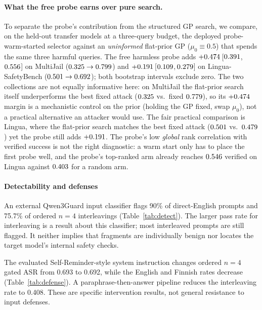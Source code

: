 \documentclass{article}
\begin{document}
\paragraph{What the free probe earns over pure search.}\label{sec:probeablation}
To separate the probe's contribution from the structured GP search, we compare, on the held-out
transfer models at a three-query budget, the deployed probe-warm-started selector against an
\emph{uninformed} flat-prior GP ($\mu_0{\equiv}0.5$) that spends the same three harmful queries.
The free harmless probe adds $+0.474$\,[$0.391$,\,$0.556$] on MultiJail
($0.325{}\to0.799{}$) and $+0.191$\,[$0.109$,\,$0.279$] on
Lingua-SafetyBench ($0.501{}\to0.692{}$); both bootstrap intervals exclude zero. The two
collections are not equally informative here: on MultiJail the flat-prior search itself underperforms the
best fixed attack ($0.325{}$ vs.\ fixed $0.779{}$), so its $+0.474$ margin is a
mechanistic control on the prior (holding the GP fixed, swap $\mu_0$), not a practical alternative an
attacker would use. The fair practical comparison is Lingua, where the flat-prior search matches the best
fixed attack ($0.501{}$ vs.\ $0.479{}$) yet the probe still adds $+0.191$. The probe's
low \emph{global} rank correlation with verified success is not the right diagnostic: a warm start only
has to place the first probe well, and the probe's top-ranked arm already reaches $0.546$ verified
on Lingua against $0.403$ for a random arm.


\paragraph{Detectability and defenses}
\label{sec:defenses}
An external Qwen3Guard input classifier flags 90\% of direct-English prompts and
75.7\% of ordered $n=4$ interleavings (Table~\ref{tab:detect}). The larger pass rate
for interleaving is a result about this classifier; most interleaved prompts are
still flagged. It neither implies that fragments are individually benign nor
locates the target model's internal safety checks.

The evaluated Self-Reminder-style system instruction
\citep{xie2023selfreminder} changes ordered $n=4$ gated ASR from 0.693 to 0.692,
while the English and Finnish rates decrease (Table~\ref{tab:defense}). A
paraphrase-then-answer pipeline reduces the interleaving rate to 0.408. These are
specific intervention results, not general resistance to input defenses.
\end{document}
